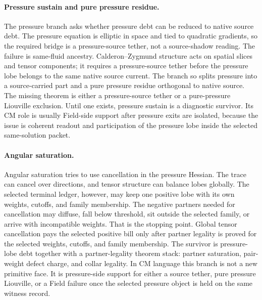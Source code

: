 \paragraph{Pressure sustain and pure pressure residue.}
The pressure branch asks whether pressure debt can be reduced to native source
debt.
The pressure equation is elliptic in space and tied to quadratic gradients, so
the required bridge is a pressure-source tether, not a source-shadow reading.
The failure is same-fluid ancestry.
Calderon--Zygmund structure acts on spatial slices and tensor components; it
requires a pressure-source tether before the pressure lobe belongs to the same
native source current.
The branch so splits pressure into a source-carried part and a pure
pressure residue orthogonal to native source.
The missing theorem is either a pressure-source tether or a pure-pressure
Liouville exclusion.
Until one exists, pressure sustain is a diagnostic survivor.
Its CM role is usually Field-side support after pressure exits are isolated,
because the issue is coherent readout and participation of the pressure lobe
inside the selected same-solution packet.

\paragraph{Angular saturation.}
Angular saturation tries to use cancellation in the pressure Hessian.
The trace can cancel over directions, and tensor structure can balance lobes
globally.
The selected terminal ledger, however, may keep one positive lobe with its own
weights, cutoffs, and family membership.
The negative partners needed for cancellation may diffuse, fall below
threshold, sit outside the selected family, or arrive with incompatible
weights.
That is the stopping point.
Global tensor cancellation pays the selected positive bill only after partner
legality is proved for the selected weights, cutoffs, and family membership.
The survivor is pressure-lobe debt together with a partner-legality theorem
stack: partner saturation, pair-weight defect charge, and collar legality.
In CM language this branch is not a new primitive face.
It is pressure-side support for either a source tether, pure pressure
Liouville, or a Field failure once the selected pressure object is held on the
same witness record.

